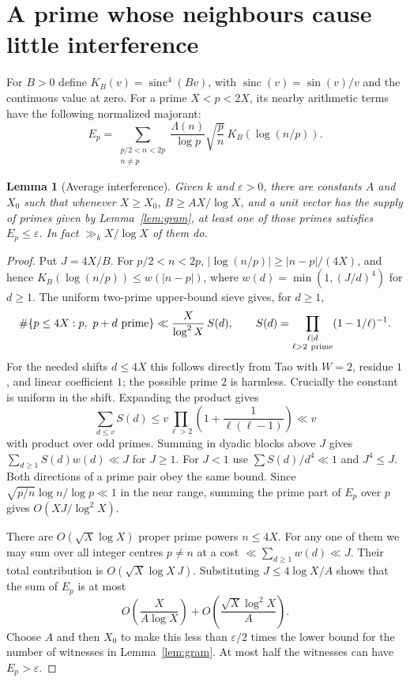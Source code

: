 \documentclass[11pt]{article}
\newtheorem{lemma}[theorem]{Lemma}
\newcommand{\sinc}{\operatorname{sinc}}
\begin{document}
\section{A prime whose neighbours cause little interference}
For $B>0$ define $K_B(v)=\sinc^4(Bv)$, with $\sinc(v)=\sin(v)/v$ and the continuous value at zero. For a prime $X<p<2X$, its nearby arithmetic terms have the following normalized majorant:
\[
 E_p=\sum_{\substack{p/2<n<2p\\ n\ne p}}
 \frac{\Lambda(n)}{\log p}\sqrt{\frac pn}\, K_B(\log(n/p)).
\]
\begin{lemma}[Average interference]\label{lem:sieve}
Given $k$ and $\varepsilon>0$, there are constants $A$ and $X_0$ such that whenever $X\ge X_0$, $B\ge AX/\log X$, and a unit vector has the supply of primes given by Lemma~\ref{lem:gram}, at least one of those primes satisfies $E_p\le\varepsilon$. In fact $\gg_k X/\log X$ of them do.
\end{lemma}
\begin{proof}
Put $J=4X/B$. For $p/2<n<2p$, $|\log(n/p)|\ge |n-p|/(4X)$, and hence $K_B(\log(n/p))\le w(|n-p|)$, where $w(d)=\min(1,(J/d)^4)$ for $d\ge1$.
The uniform two-prime upper-bound sieve gives, for $d\ge1$,
\[
 \#\{p\le4X:p,\ p+d\text{ prime}\}
 \ll \frac{X}{\log^2 X}\,S(d),\qquad
 S(d)=\prod_{\substack{\ell\mid d\\ \ell>2\ {\rm prime}}}(1-1/\ell)^{-1}.
\]
For the needed shifts $d\le 4X$ this follows directly from Tao \cite[Corollary A.2]{tao} with $W=2$, residue $1$, and linear coefficient $1$; the possible prime $2$ is harmless. Crucially the constant is uniform in the shift. Expanding the product gives
\[
 \sum_{d\le v}S(d)\le v\prod_{\ell>2}\left(1+\frac{1}{\ell(\ell-1)}\right)\ll v
\]
with product over odd primes. Summing in dyadic blocks above $J$ gives $\sum_{d\ge1}S(d)w(d)\ll J$ for $J\ge1$. For $J<1$ use $\sum S(d)/d^4\ll1$ and $J^4\le J$. Both directions of a prime pair obey the same bound. Since $\sqrt{p/n}\log n/\log p\ll1$ in the near range, summing the prime part of $E_p$ over $p$ gives $O(XJ/\log^2 X)$.

There are $O(\sqrt X\log X)$ proper prime powers $n\le4X$. For any one of them we may sum over all integer centres $p\ne n$ at a cost $\ll\sum_{d\ge1}w(d)\ll J$. Their total contribution is $O(\sqrt X\log X\,J)$. Substituting $J\le4\log X/A$ shows that the sum of $E_p$ is at most
\[
 O\left(\frac{X}{A\log X}\right)+O\left(\frac{\sqrt X\log^2 X}{A}\right).
\]
Choose $A$ and then $X_0$ to make this less than $\varepsilon/2$ times the lower bound for the number of witnesses in Lemma~\ref{lem:gram}. At most half the witnesses can have $E_p>\varepsilon$.
\end{proof}
\end{document}
